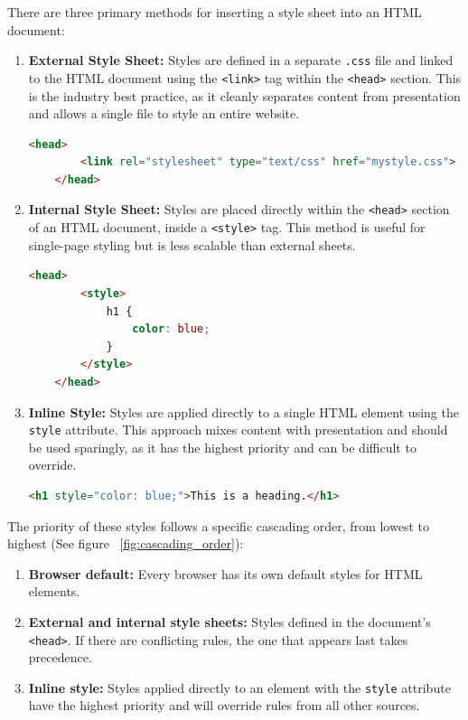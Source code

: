 \documentclass{scrbook}
\begin{document}
There are three primary methods for inserting a style sheet into an HTML document:

\begin{enumerate}
    \item \textbf{External Style Sheet:} Styles are defined in a separate \texttt{.css} file and linked to the HTML document using the \texttt{<link>} tag within the \texttt{<head>} section. This is the industry best practice, as it cleanly separates content from presentation and allows a single file to style an entire website.
    \begin{lstlisting}[language=HTML, caption={Linking of an external style sheet}]
    <head>
        <link rel="stylesheet" type="text/css" href="mystyle.css">
    </head>
    \end{lstlisting}
    
    \item \textbf{Internal Style Sheet:} Styles are placed directly within the \texttt{<head>} section of an HTML document, inside a \texttt{<style>} tag. This method is useful for single-page styling but is less scalable than external sheets.
    \begin{lstlisting}[language=HTML, caption={Style sheet definition in the head tag}]
    <head>
        <style>
            h1 {
                color: blue;
            }
        </style>
    </head>
    \end{lstlisting}
    
    \item \textbf{Inline Style:} Styles are applied directly to a single HTML element using the \texttt{style} attribute. This approach mixes content with presentation and should be used sparingly, as it has the highest priority and can be difficult to override.
    \begin{lstlisting}[language=HTML, caption={Inline element style definition}]
    <h1 style="color: blue;">This is a heading.</h1>
    \end{lstlisting}
\end{enumerate}

The priority of these styles follows a specific cascading order, from lowest to highest (See figure ~\ref{fig:cascading_order}):

\begin{enumerate}
    \item \textbf{Browser default:} Every browser has its own default styles for HTML elements.
    \item \textbf{External and internal style sheets:} Styles defined in the document's \texttt{<head>}. If there are conflicting rules, the one that appears last takes precedence.
    \item \textbf{Inline style:} Styles applied directly to an element with the \texttt{style} attribute have the highest priority and will override rules from all other sources.
\end{enumerate}
\end{document}
